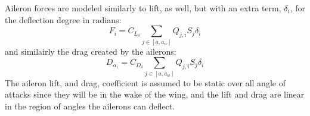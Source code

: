 Aileron forces are modeled similarly to lift, as well, but with an extra term, $\delta_i$, for the deflection degree in radians:
\begin{equation}
    F_i = C_{L_\delta} \sum_{j \in [a, a_w]}  Q_{j,i} S_j \delta_i
\end{equation}
and similairly the drag created by the ailerons:
\begin{equation}
    D_{\alpha_i} = C_{D_\delta} \sum_{j \in [a, a_w]}  Q_{j,i} S_j \delta_i
\end{equation}
The aileron lift, and drag, coefficient is assumed to be static over all angle of attacks since they will be in the wake of the wing, and the lift and drag are linear in the region of angles the ailerons can deflect.
